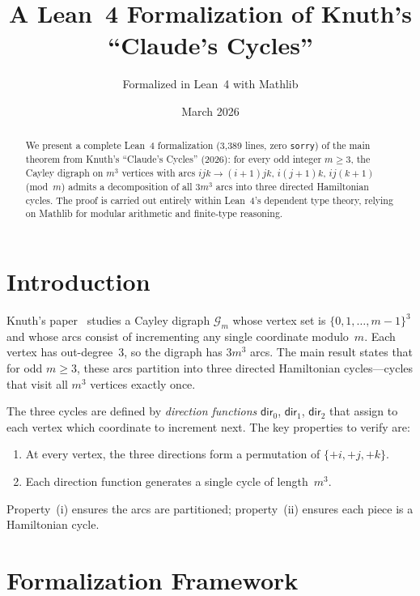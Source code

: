 \documentclass[11pt,a4paper]{article}
\title{A Lean~4 Formalization of Knuth's ``Claude's Cycles''}
\author{Formalized in Lean~4 with Mathlib}
\date{March 2026}
\begin{document}
\maketitle

\begin{abstract}
We present a complete Lean~4 formalization (3{,}389 lines, zero \texttt{sorry})
of the main theorem from Knuth's ``Claude's Cycles'' (2026):
for every odd integer $m \ge 3$, the Cayley digraph on $m^3$ vertices
with arcs $ijk \to (i{+}1)jk$, $i(j{+}1)k$, $ij(k{+}1)$ (mod~$m$)
admits a decomposition of all $3m^3$ arcs into three directed Hamiltonian cycles.
The proof is carried out entirely within Lean~4's dependent type theory,
relying on Mathlib for modular arithmetic and finite-type reasoning.
\end{abstract}

\tableofcontents
\newpage

\section{Introduction}
\label{sec:intro}

Knuth's paper~\cite{knuth2026} studies a Cayley digraph $\mathcal{G}_m$ whose vertex set is
$\{0, 1, \ldots, m{-}1\}^3$ and whose arcs consist of incrementing any single
coordinate modulo~$m$.  Each vertex has out-degree~3, so the digraph has $3m^3$ arcs.
The main result states that for odd $m \ge 3$, these arcs partition into three directed
Hamiltonian cycles---cycles that visit all $m^3$ vertices exactly once.

The three cycles are defined by \emph{direction functions} $\mathsf{dir}_0$,
$\mathsf{dir}_1$, $\mathsf{dir}_2$ that assign to each vertex which coordinate
to increment next.  The key properties to verify are:
\begin{enumerate}[label=(\roman*)]
  \item At every vertex, the three directions form a permutation of $\{+i, +j, +k\}$.
  \item Each direction function generates a single cycle of length~$m^3$.
\end{enumerate}

Property~(i) ensures the arcs are partitioned; property~(ii) ensures each
piece is a Hamiltonian cycle.

\section{Formalization Framework}
\label{sec:framework}
\end{document}
